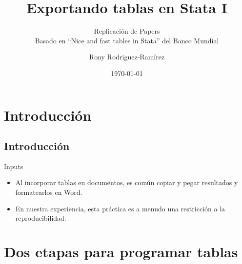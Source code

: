 \documentclass[10pt, aspectratio=169, compress]{beamer}
\title{Exportando tablas en Stata I}
\subtitle{Replicación de Papers\\Basado en ``Nice and fast tables in Stata'' del Banco Mundial}
\author{Rony Rodriguez-Ramírez}
\institute{LAMBDA}
\date{\today}
\begin{document}
\begin{frame}[plain]
	\maketitle 
\end{frame}
\section{Introducción}
\subsection{Introducción}
\begin{frame}[t]{Inputs}
	\begin{itemize}
		\item Al incorporar tablas en documentos, es común copiar y pegar resultados y formatearlos en Word.
		\item En nuestra experiencia, esta práctica es a menudo una restricción a la reproducibilidad.
	\end{itemize}
\end{frame}
\section{Dos etapas para programar tablas}
\end{document}
